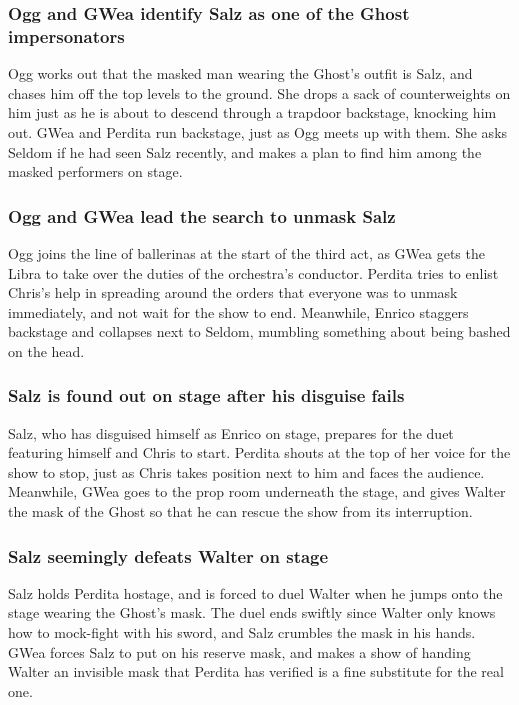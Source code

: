 \subsubsection{\Gls{Ogg} and \Gls{GWea} identify \Gls{Salz} as one of the \Gls{Ghost} impersonators}
\Gls{Ogg} works out that the masked man wearing the \Gls{Ghost}'s outfit is \Gls{Salz}, and chases 
him off the top levels to the ground. She drops a sack of counterweights on him just as he is 
about to descend through a trapdoor backstage, knocking him out. \Gls{GWea} and \Gls{Perdita} run 
backstage, just as \Gls{Ogg} meets up with them. She asks \Gls{Seldom} if he had seen \Gls{Salz}
recently, and makes a plan to find him among the masked performers on stage.

\subsubsection{\Gls{Ogg} and \Gls{GWea} lead the search to unmask \Gls{Salz}}
\Gls{Ogg} joins the line of ballerinas at the start of the third act, as \Gls{GWea} gets the 
\Gls{Libra} to take over the duties of the orchestra's conductor. \Gls{Perdita} tries to enlist 
\Gls{Chris}'s help in spreading around the orders that everyone was to unmask immediately, and not 
wait for the show to end. Meanwhile, \Gls{Enrico} staggers backstage and collapses next to 
\Gls{Seldom}, mumbling something about being bashed on the head.

\subsubsection{\Gls{Salz} is found out on stage after his disguise fails}
\Gls{Salz}, who has disguised himself as \Gls{Enrico} on stage, prepares for the duet featuring
himself and \Gls{Chris} to start. \Gls{Perdita} shouts at the top of her voice for the show to stop,
just as \Gls{Chris} takes position next to him and faces the audience. Meanwhile, \Gls{GWea} goes 
to the prop room underneath the stage, and gives \Gls{Walter} the mask of the \Gls{Ghost} so that 
he can rescue the show from its interruption.

\subsubsection{\Gls{Salz} seemingly defeats \Gls{Walter} on stage}
\Gls{Salz} holds \Gls{Perdita} hostage, and is forced to duel \Gls{Walter} when he jumps onto the 
stage wearing the \Gls{Ghost}'s mask. The duel ends swiftly since \Gls{Walter} only knows how to 
mock-fight with his sword, and \Gls{Salz} crumbles the mask in his hands. \Gls{GWea} forces
\Gls{Salz} to put on his reserve mask, and makes a show of handing \Gls{Walter} an invisible mask 
that \Gls{Perdita} has verified is a fine substitute for the real one. 

